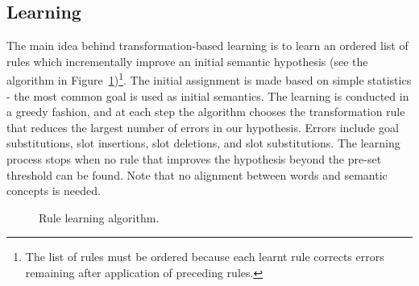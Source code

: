 \documentclass{article}
\begin{document}
\subsection{Learning} \label{sec:tbl:learning}
The main idea behind transformation-based learning is to learn an ordered list of rules which incrementally improve an initial semantic hypothesis (see the algorithm in Figure~\ref{alg:tbl:learning})\footnote{The list of rules must be ordered because each learnt rule corrects errors remaining after application of preceding rules.}. The initial assignment is made based on simple statistics - the most common goal is used as initial semantics. The learning is conducted in a greedy fashion, and at each step the algorithm chooses the transformation rule that reduces the largest number of errors in our hypothesis. Errors include goal substitutions, slot insertions, slot deletions, and slot substitutions. The learning process stops when no rule that improves the hypothesis beyond the pre-set threshold can be found. Note that no alignment between words and semantic concepts is needed.


\begin{figure}
\vspace{-0.25cm}
\caption{Rule learning algorithm.}
\label{alg:tbl:learning}
\end{figure} 
\end{document}
